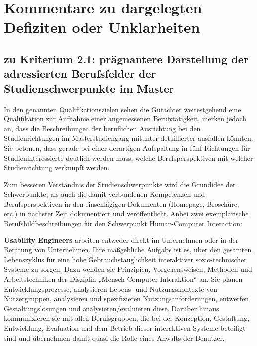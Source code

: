 \chapter{Kommentare zu dargelegten Defiziten oder
Unklarheiten}\label{kommentare-zu-dargelegten-defiziten-oder-unklarheiten}

\section{zu Kriterium 2.1: prägnantere Darstellung der adressierten
Berufsfelder der Studienschwerpunkte im
Master}\label{zu-kriterium-2.1-pruxe4gnantere-darstellung-der-adressierten-berufsfelder-der-studienschwerpunkte-im-master}

\begin{siderules}
In den genannten Qualifikationszielen sehen die Gutachter weitestgehend
eine Qualifikation zur Aufnahme einer angemessenen Berufstätigkeit,
merken jedoch an, dass die Beschreibungen der beruflichen Ausrichtung
bei den Studienrichtungen im Masterstudiengang mitunter detaillierter
ausfallen könnten. Sie betonen, dass gerade bei einer derartigen
Aufspaltung in fünf Richtungen für Studieninteressierte deutlich werden
muss, welche Berufsperspektiven mit welcher Studienrichtung verknüpft
werden.
\end{siderules}

Zum besseren Verständnis der Studienschwerpunkte wird die Grundidee der
Schwerpunkte, als auch die damit verbundenen Kompetenzen und
Berufsperspektiven in den einschlägigen Dokumenten (Homepage, Broschüre,
etc.) in nächster Zeit dokumentiert und veröffentlicht. Anbei zwei
exemplarische Berufsbildbeschreibungen für den Schwerpunkt
Human-Computer Interaction:

\textbf{Usability Engineers} arbeiten entweder direkt im Unternehmen
oder in der Beratung von Unternehmen. Ihre maßgebliche Aufgabe ist es,
über den gesamten Lebenszyklus für eine hohe Gebrauchstauglichkeit
interaktiver sozio-technischer Systeme zu sorgen. Dazu wenden sie
Prinzipien, Vorgehensweisen, Methoden und Arbeitstechniken der Disziplin
„Mensch-Computer-Interaktion`` an. Sie planen Entwicklungsprozesse,
analysieren Lebens- und Nutzungskontexte von Nutzergruppen, analysieren
und spezifizieren Nutzungsanforderungen, entwerfen Gestaltungslösungen
und analysieren/evaluieren diese. Darüber hinaus kommunizieren sie mit
allen Berufsgruppen, die bei der Konzeption, Gestaltung, Entwicklung,
Evaluation und dem Betrieb dieser interaktiven Systeme beteiligt sind
und übernehmen damit quasi die Rolle eines Anwalts der Benutzer.

